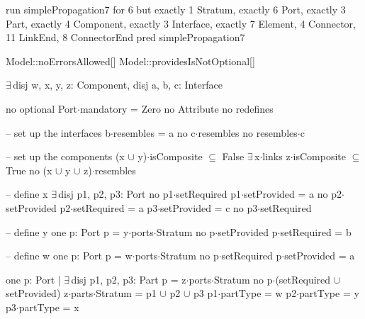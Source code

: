 run simplePropagation7 for 6 but exactly 1 Stratum, exactly 6 Port, exactly 3 Part, exactly 4 Component, exactly 3 Interface, exactly 7 Element, 4 Connector, 11 LinkEnd, 8 ConnectorEnd
pred simplePropagation7
{
  Model::noErrorsAllowed[]
  Model::providesIsNotOptional[]

  $\exists\,$disj w, x, y, z: Component,
       disj a, b, c: Interface
  {
    no optional
    Port$\cdot$mandatory = Zero
    no Attribute
    no redefines
  
    -- set up the interfaces
    b$\cdot$resembles = a
    no c$\cdot$resembles
    no resembles$\cdot$c
  
    -- set up the components
    (x $\cup$ y)$\cdot$isComposite $\subseteq$ False
    $\exists\,$x$\cdot$links
    z$\cdot$isComposite $\subseteq$ True
    no (x $\cup$ y $\cup$ z)$\cdot$resembles
    
    -- define x
    $\exists\,$disj p1, p2, p3: Port
    {
      no p1$\cdot$setRequired
      p1$\cdot$setProvided = a
      no p2$\cdot$setProvided
      p2$\cdot$setRequired = a
      p3$\cdot$setProvided = c
      no p3$\cdot$setRequired
    }
    
    -- define y
    one p: Port
    {
      p = y$\cdot$ports$\cdot$Stratum
      no p$\cdot$setProvided
      p$\cdot$setRequired = b
    }
    
    -- define w
    one p: Port
    {
      p = w$\cdot$ports$\cdot$Stratum
      no p$\cdot$setRequired
      p$\cdot$setProvided = a
    }
    
    one p: Port | $\exists\,$disj p1, p2, p3: Part
    {
      p = z$\cdot$ports$\cdot$Stratum
      no p$\cdot$(setRequired $\cup$ setProvided)
      z$\cdot$parts$\cdot$Stratum = p1 $\cup$ p2 $\cup$ p3
      p1$\cdot$partType = w
      p2$\cdot$partType = y
      p3$\cdot$partType = x
    }
  }
}

